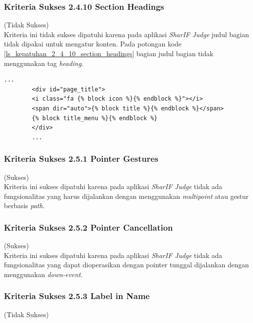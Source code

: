 \documentclass[a4paper,twoside]{article}
\begin{document}
\begin{enumerate}
\begin{itemize}
		\end{itemize}
		
		\subsubsection*{Kriteria Sukses 2.4.10 Section Headings}
		\label{subsubsec:kepatuhan_kriteria_2.4.10}
		(Tidak Sukses) \\
		
		Kriteria ini tidak sukses dipatuhi karena pada aplikasi \textit{SharIF Judge} judul bagian tidak dipakai untuk mengatur konten. Pada potongan kode \ref{ls_kepatuhan_2_4_10_section_headings} bagian judul bagian tidak menggunakan tag \textit{heading}.
		\begin{lstlisting}[basicstyle=\ttfamily, frame=single,
		columns=fullflexible, keepspaces=true, breaklines=true, label=ls_kepatuhan_2_4_10_section_headings, caption=Kriteria Sukses 2.4.10 - Title Heading]
		...
		<div id="page_title">
		<i class="fa {% block icon %}{% endblock %}"></i>
		<span dir="auto">{% block title %}{% endblock %}</span>
		{% block title_menu %}{% endblock %}
		</div>
		...
		\end{lstlisting}
		
		\subsubsection*{Kriteria Sukses 2.5.1 Pointer Gestures}
		\label{subsubsec:kepatuhan_kriteria_2.5.1}
		(Sukses) \\
		
		Kriteria ini sukses dipatuhi karena pada aplikasi \textit{SharIF Judge} tidak ada fungsionalitas yang harus dijalankan dengan menggunakan \textit{multipoint} atau gestur berbasis \textit{path}.
		
		\subsubsection*{Kriteria Sukses 2.5.2 Pointer Cancellation}
		\label{subsubsec:kepatuhan_kriteria_2.5.2}
		(Sukses) \\
		
		Kriteria ini sukses dipatuhi karena pada aplikasi \textit{SharIF Judge} tidak ada fungsionalitas yang dapat dioperasikan dengan pointer tunggal dijalankan dengan menggunakan \textit{down-event}.
		
		\subsubsection*{Kriteria Sukses 2.5.3 Label in Name}
		\label{subsubsec:kepatuhan_kriteria_2.5.3}
		(Tidak Sukses) \\
		

\end{enumerate}
\end{document}
